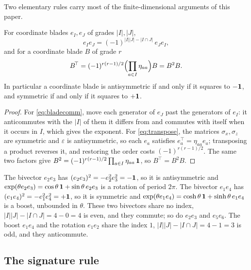Two elementary rules carry most of the finite-dimensional arguments of this paper.

\begin{lemma}
\label{lem:blade}
For coordinate blades $e_I,e_J$ of grades $|I|,|J|$,
\begin{equation}
\label{eq:bladecomm}
e_Ie_J=(-1)^{|I||J|-|I\cap J|}\,e_Je_I ,
\end{equation}
and for a coordinate blade $B$ of grade $r$
\begin{equation}
\label{eq:transpose}
B^{\!\top}=(-1)^{r(r-1)/2}\Bigl(\prod_{a\in I}\eta_{aa}\Bigr)B=B^2B .
\end{equation}
In particular a coordinate blade is antisymmetric if and only if it squares to $-\mathbf 1$, and symmetric if and only if it squares to $+\mathbf 1$.
\end{lemma}

\begin{proof}
For \eqref{eq:bladecomm}, move each generator of $e_J$ past the generators of $e_I$: it anticommutes with the $|I|$ of them
it differs from and commutes with itself when it occurs in $I$, which gives the exponent. For \eqref{eq:transpose}, the
matrices $\sigma_x,\sigma_z$ are symmetric and $\varepsilon$ is antisymmetric, so each $e_a$ satisfies $e_a^{\!\top}=\eta_{aa}e_a$;
transposing a product reverses it, and restoring the order costs $(-1)^{r(r-1)/2}$. The same two factors give
$B^2=(-1)^{r(r-1)/2}\prod_{a\in I}\eta_{aa}\,\mathbf 1$, so $B^{\!\top}=B^2B$.
\end{proof}

\begin{example}
\label{ex:blades}
The bivector $e_2e_3$ has $(e_2e_3)^2=-e_2^2e_3^2=-\mathbf 1$, so it is antisymmetric and $\exp(\theta e_2e_3)=\cos\theta\,\mathbf 1+
\sin\theta\,e_2e_3$ is a rotation of period $2\pi$. The bivector $e_1e_4$ has $(e_1e_4)^2=-e_1^2e_4^2=+\mathbf 1$, so it is
symmetric and $\exp(\theta e_1e_4)=\cosh\theta\,\mathbf 1+\sinh\theta\,e_1e_4$ is a boost, unbounded in $\theta$. These two
bivectors share no index, $|I||J|-|I\cap J|=4-0=4$ is even, and they commute; so do $e_2e_3$ and $e_5e_6$. The boost $e_1e_4$ and the
rotation $e_1e_2$ share the index $1$, $|I||J|-|I\cap J|=4-1=3$ is odd, and they anticommute.
\end{example}

\subsection{The signature rule}
\label{sec:sigrule}

